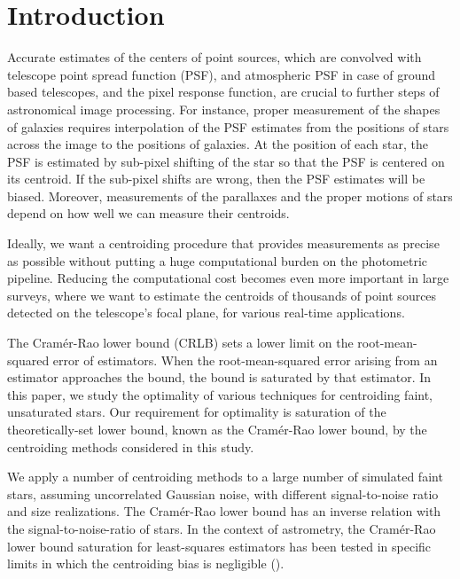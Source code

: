 \documentclass[onecolumn]{aastex61}
\newcommand{\todo}[1]{{\textcolor{dred}{ #1}}}
\begin{document}

\section{Introduction}

Accurate estimates of the centers of point sources, which are convolved with telescope point spread function (PSF), and atmospheric PSF in case of ground based telescopes, and the pixel response function, are crucial to further steps of
astronomical image processing. 
For instance, proper measurement of the shapes of galaxies
requires interpolation of the PSF estimates from the positions of stars across the
image to the positions of galaxies. At the position of each star, the PSF is estimated by sub-pixel 
shifting of the star so that the PSF is centered on its centroid. If the sub-pixel shifts are wrong, then 
the PSF estimates will be biased. Moreover, measurements of the parallaxes and the proper motions of stars
depend on how well we can measure their centroids. 

Ideally, we want a centroiding procedure that provides measurements as precise 
as possible without putting a huge computational burden on the photometric pipeline.
Reducing the computational cost becomes even more important in large surveys,
where we want to estimate the centroids of thousands of point sources detected
on the telescope's focal plane, for various real-time applications. 

\todo{The Cram\'{e}r-Rao lower bound (CRLB) sets a lower limit on the root-mean-squared error of estimators. When the root-mean-squared error arising from an estimator approaches the bound, the bound is saturated by that estimator. In this paper, we study the optimality of various techniques for centroiding faint, unsaturated stars. Our requirement for optimality is saturation of the 
theoretically-set lower bound, known as the Cram\'{e}r-Rao lower bound, by the 
centroiding methods considered in this study.}

\todo{We apply a number of centroiding methods to a large number of simulated faint stars, assuming uncorrelated 
Gaussian noise, with different signal-to-noise ratio and size realizations. 
The Cram\'{e}r-Rao lower bound has an inverse relation with the signal-to-noise-ratio 
of stars. In the context of astrometry, the Cram\'{e}r-Rao lower bound saturation for least-squares estimators has been tested in specific limits in which the centroiding bias is negligible (\citealt{lobos}).}
\end{document}
